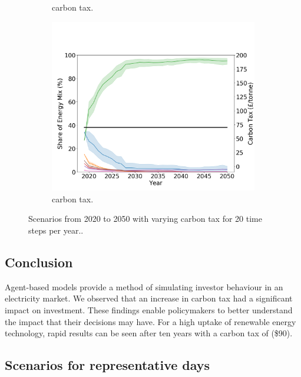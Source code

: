 \begin{figure}[h]
\begin{subfigure}[b]{0.6\textwidth}
		\caption[]%
		{ carbon tax.}
		\label{fig:demand99carbon20}
	\end{subfigure}
	\begin{subfigure}[b]{0.6\textwidth}
		\centering
		\includegraphics[width=\textwidth]{Chapter4/figures/scenarios/demand099-carbon70-datetime.png}
		\caption[Network2]%
		{\small {} carbon tax.}
		\label{fig:demand99carbon70}
	\end{subfigure}
	\caption{Scenarios from 2020 to 2050 with varying carbon tax for 20 time steps per year..}
\end{figure}









\subsection{Conclusion}


Agent-based models provide a method of simulating investor behaviour in an electricity market. We observed that an increase in carbon tax had a significant impact on investment. These findings enable policymakers to better understand the impact that their decisions may have. For a high uptake of renewable energy technology, rapid results can be seen after ten years with a carbon tax of  (\$90).




\subsection{Scenarios for representative days}

